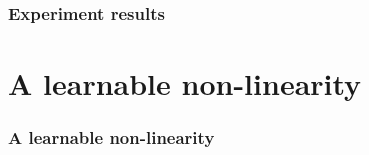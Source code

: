 \documentclass[aspectratio=169]{beamer}
\begin{document}
\begin{frame}
\frametitle{Experiment results}
\begin{figure}[ht]\centering
{}
\end{figure}
\end{frame}

\section{A learnable non-linearity}

\begin{frame}
\frametitle{A learnable non-linearity}
\begin{figure}[ht]\centering
{}
\end{figure}
\end{frame}
\end{document}
